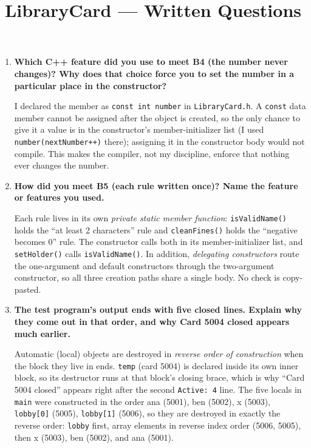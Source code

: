 \documentclass[11pt]{article}
\title{LibraryCard --- Written Questions}
\author{}
\date{}
\begin{document}
\maketitle

\begin{enumerate}[leftmargin=2em, itemsep=1em]

\item \textbf{Which C++ feature did you use to meet B4 (the number never changes)?
Why does that choice force you to set the number in a particular place in the constructor?}

I declared the member as \texttt{const int number} in \texttt{LibraryCard.h}.
A \texttt{const} data member cannot be assigned after the object is created, so
the only chance to give it a value is in the constructor's member-initializer
list (I used \texttt{number(nextNumber++)} there); assigning it in the
constructor body would not compile. This makes the compiler, not my
discipline, enforce that nothing ever changes the number.

\item \textbf{How did you meet B5 (each rule written once)? Name the feature or
features you used.}

Each rule lives in its own \emph{private static member function}:
\texttt{isValidName()} holds the ``at least 2 characters'' rule and
\texttt{cleanFines()} holds the ``negative becomes 0'' rule. The constructor
calls both in its member-initializer list, and \texttt{setHolder()} calls
\texttt{isValidName()}. In addition, \emph{delegating constructors} route the
one-argument and default constructors through the two-argument constructor,
so all three creation paths share a single body. No check is copy-pasted.

\item \textbf{The test program's output ends with five closed lines. Explain why
they come out in that order, and why Card 5004 closed appears much earlier.}

Automatic (local) objects are destroyed in \emph{reverse order of construction}
when the block they live in ends. \texttt{temp} (card 5004) is declared inside
its own inner block, so its destructor runs at that block's closing brace,
which is why ``Card 5004 closed'' appears right after the second
\texttt{Active: 4} line. The five locals in \texttt{main} were constructed in
the order ana (5001), ben (5002), x (5003), \texttt{lobby[0]} (5005),
\texttt{lobby[1]} (5006), so they are destroyed in exactly the reverse order:
\texttt{lobby} first, array elements in reverse index order (5006, 5005),
then x (5003), ben (5002), and ana (5001).


\end{enumerate}
\end{document}

